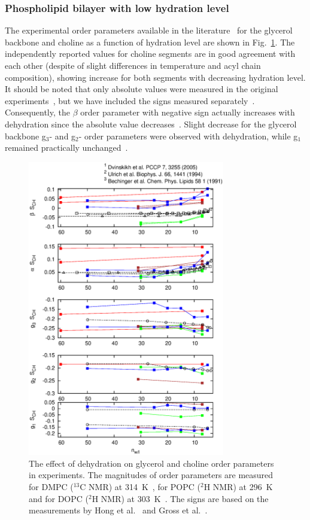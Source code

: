 \documentclass[pre,aps,floatfix,authordate1-4,twocolumn]{revtex4-1}
\begin{document}
\subsubsection{Phospholipid bilayer with low hydration level}
The experimental order parameters available in the literature~\cite{dvinskikh05b,ulrich94,bechinger91} 
for the glycerol backbone and choline as a function of hydration level are shown in Fig.~\ref{ordPhydr}. 
The independently reported values for choline segments are in good agreement with each other (despite of 
slight differences in temperature and acyl chain composition),
showing increase for both segments with decreasing hydration level. It should be noted that only 
absolute values were measured in the original experiments~\cite{dvinskikh05b,ulrich94,bechinger91}, but
we have included the signs measured separately~\cite{hong95a,hong95b,gross97}. 
Consequently, the $\beta$ order parameter with negative sign actually increases with dehydration 
since the absolute value decreases~\cite{dvinskikh05b,ulrich94,bechinger91}.
Slight decrease for the glycerol backbone g$_3$- and g$_2$- order parameters were observed with dehydration, 
while g$_1$ remained practically unchanged~\cite{dvinskikh05b}.
\begin{figure}[]
  \centering
  \includegraphics[width=8.6cm]{OrderParameterDEHYDpresentation.eps}
  \caption{\label{ordPhydr}
    The effect of dehydration on glycerol and choline order parameters in experiments.
    The magnitudes of order parameters are measured for DMPC ($^{13}$C NMR) at 314~K~\cite{dvinskikh05b}, 
    for POPC ($^2$H NMR) at 296~K~\cite{bechinger91} and for DOPC ($^2$H NMR) at 303~K~\cite{ulrich94}. 
    The signs are based on the measurements by Hong et al.~\cite{hong95a,hong95b} 
    and Gross et al.~\cite{gross97}.
  }
\end{figure}
\end{document}
